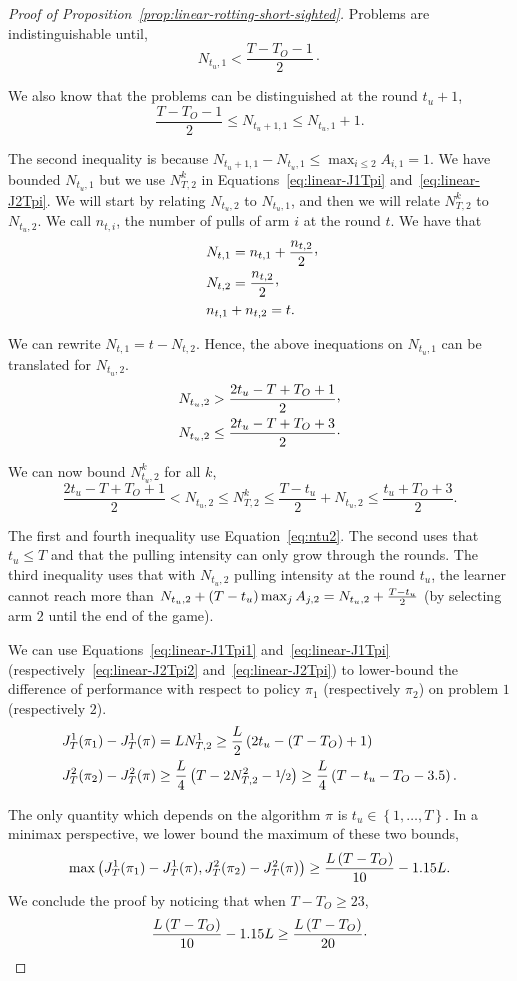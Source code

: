 \begin{proof}[Proof of Proposition~\ref{prop:linear-rotting-short-sighted}]
Problems are indistinguishable until,
\[ N_{t_u,1} < \frac{T - T_O -1}{2} \cdot\]

We also know that the problems can be distinguished at the round $t_u+1$, \ie 
\[  \frac{T - T_O -1}{2} \leq N_{t_u+1,1} \leq N_{t_u,1} +1.\] 

The second inequality is because $N_{t_u+1,1} - N_{t_u,1} \leq \max_{i \leq 2} A_{i,1} = 1$. We have bounded $N_{t_u,1}$ but we use $N_{T,2}^k$  in Equations~\ref{eq:linear-J1Tpi} and~\ref{eq:linear-J2Tpi}. We will start by relating $N_{t_u,2}$ to $N_{t_u,1}$, and then we will relate $N_{T,2}^k$ to $N_{t_u,2}$. We call $n_{t,i}$, the number of pulls of arm $i$ at the round $t$. We have that 
\begin{align*}
&N_{t,1} = n_{t,1} + \frac{n_{t,2}}{2}\CommaBin \\
&N_{t,2} = \frac{n_{t,2}}{2}\CommaBin\\\
&n_{t,1} + n_{t,2} = t.
\end{align*}

We can rewrite $N_{t,1} = t - N_{t,2}$. Hence, the above inequations on $N_{t_u,1}$ can be translated for $N_{t_u,2}$. 
\begin{align}
&N_{t_u,2} > \frac{2t_u - T + T_O+1}{2}\CommaBin \nonumber\\
&N_{t_u,2} \leq \frac{2t_u - T +T_O +3}{2} \cdot\label{eq:ntu2}
\end{align}

We can now bound $N_{t_u,2}^k$ for all $k$,
\[
 \frac{2t_u - T + T_O+1}{2} <N_{t_u,2} \leq N_{T,2} ^k \leq \frac{T-t_u}{2} + N_{t_u,2} \leq \frac{t_u +T_O +3}{2}. 
\]

The first and fourth inequality use Equation~\ref{eq:ntu2}. The second uses that $t_u\leq T$ and that the pulling intensity can only grow through the rounds. The third inequality uses that with $N_{t_u,2}$ pulling intensity at the round $t_u$, the learner cannot reach more than $N_{t_u,2} + \left(T-t_u\right) \max_{j}A_{j,2} =N_{t_u,2} + \frac{T-t_u}{2}$ (by selecting arm $2$ until the end of the game).

We can use Equations~\ref{eq:linear-J1Tpi1} and~\ref{eq:linear-J1Tpi} (respectively~\ref{eq:linear-J2Tpi2} and~\ref{eq:linear-J2Tpi}) to lower-bound the difference of performance with respect to policy $\pi_1$ (respectively $\pi_2$) on problem $1$ (respectively $2$). 
\begin{align*}
&J_T^1(\pi_1)- J_T^1(\pi) = LN_{T,2}^1 \geq \frac{L}{2} \left(2t_u - \left(T - T_O\right) +1\right)\\
&J_T^2(\pi_2)- J_T^2(\pi) \geq  \frac{L}{4} \left(T - 2N_{T,2}^2- \nicefrac{1}{2}\right) \geq\frac{L}{4} \left(T -t_u - T_O - 3.5 \right) .
\end{align*}

The only quantity which depends on the algorithm $\pi$ is $t_u\in \left\{1, \dots, T\right\}$. In a minimax perspective, we lower bound the maximum of these two bounds,
\[
\max\left(J_T^1(\pi_1)- J_T^1(\pi), J_T^2(\pi_2)- J_T^2(\pi)\right) \geq \frac{L\left(T-T_O\right)}{10} -1.15L.
\]
We conclude the proof by noticing that when $T-T_O\geq 23$, 
\[
\frac{L\left(T-T_O\right)}{10} -1.15L \geq \frac{L\left(T-T_O\right)}{20}\cdot
\]
\end{proof}

